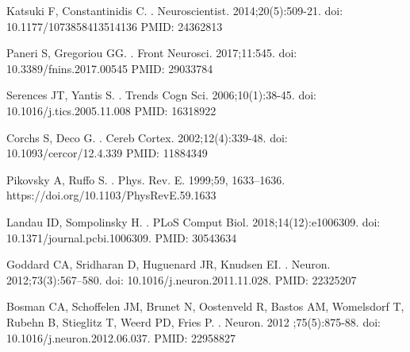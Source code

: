 \documentclass[10pt,letterpaper]{article}
\begin{document}
%
%
% 
\begin{thebibliography}{10}

Katsuki F, Constantinidis C.
.
\newblock Neuroscientist. 2014;20(5):509-21. doi: 10.1177/1073858413514136 PMID: 24362813

Paneri S, Gregoriou GG.
.
\newblock Front Neurosci. 2017;11:545. doi: 10.3389/fnins.2017.00545 PMID: 29033784

Serences JT, Yantis S.
.
\newblock Trends Cogn Sci. 2006;10(1):38-45. doi: 10.1016/j.tics.2005.11.008 PMID: 16318922

Corchs S, Deco G.
.
\newblock Cereb Cortex. 2002;12(4):339-48. doi: 10.1093/cercor/12.4.339 PMID: 11884349

Pikovsky A,  Ruffo S.
.
\newblock Phys. Rev. E. 1999;59, 1633–1636. https://doi.org/10.1103/PhysRevE.59.1633

Landau ID, Sompolinsky H.
.
\newblock PLoS Comput Biol. 2018;14(12):e1006309. doi: 10.1371/journal.pcbi.1006309. PMID: 30543634

Goddard CA, Sridharan D, Huguenard JR, Knudsen EI.
.
\newblock Neuron. 2012;73(3):567–580. doi: 10.1016/j.neuron.2011.11.028. PMID: 22325207

Bosman CA, Schoffelen JM, Brunet N, Oostenveld R, Bastos AM, Womelsdorf T, Rubehn B, Stieglitz T, Weerd PD, Fries P.
.
\newblock Neuron. 2012 ;75(5):875-88. doi: 10.1016/j.neuron.2012.06.037. PMID: 22958827


\end{thebibliography}
\end{document}
